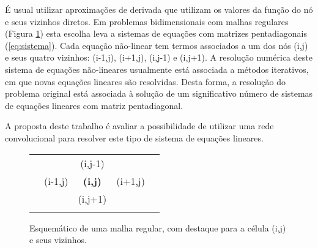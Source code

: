 \documentclass[final,5p]{elsarticle}
\numberwithin{equation}{section}
\begin{document}
    É usual utilizar aproximações de derivada que utilizam os valores da função do nó e seus vizinhos diretos. Em problemas bidimensionais com malhas regulares (Figura \ref{fig:esquematico}) esta escolha leva a sistemas de equações com matrizes pentadiagonais (\ref{eq:sistema}). Cada equação não-linear tem termos associados a um dos nós (i,j) e seus quatro vizinhos: (i-1,j), (i+1,j), (i,j-1) e (i,j+1). A resolução numérica deste sistema de equações não-lineares usualmente está associada a métodos iterativos, em que novas equações lineares são resolvidas. Desta forma, a resolução do problema original está associada à solução de um significativo número de sistemas de equações lineares com matriz pentadiagonal.

    A proposta deste trabalho é avaliar a possibilidade de utilizar uma rede convolucional para resolver este tipo de sistema de equações lineares.

    \begin{figure}
    \begin{center}
        \caption{Esquemático de uma malha regular, com destaque para a célula (i,j) e seus vizinhos.}
        \label{fig:esquematico}
        \vspace{5pt}
        \begin{tabular}{c|c|c|c|c}
            & &  & & \\
            \hline
            & & (i,j-1) & & \\
            \hline
            & (i-1,j) & \textbf{(i,j)} & (i+1,j) & \\
            \hline
            & & (i,j+1) & & \\
            \hline
            & &  & & \\
        \end{tabular}
    \end{center}
    \end{figure}
\end{document}

